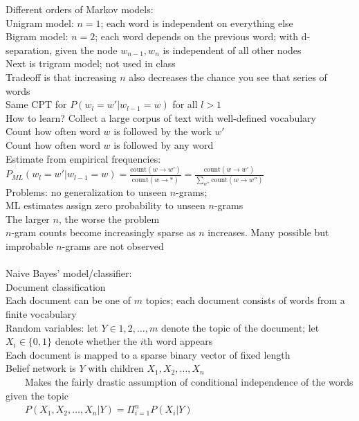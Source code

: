 \documentclass[10pt,letterpaper,unboxed,cm]{article}
\newcommand{\tab}{~~~~}
\begin{document}
Different orders of Markov models: \\
Unigram model: $n = 1$; each word is independent on everything else\\
Bigram model: $n = 2$; each word depends on the previous word; with d-separation, given the node $w_{n-1}, w_n$ is independent of all other nodes\\
Next is trigram model; not used in class\\
Tradeoff is that increasing $n$ also decreases the chance you see that series of words\\
Same CPT for $P(w_l = w'|w_{l-1} = w)$ for all $l > 1$\\
How to learn? Collect a large corpus of text with well-defined vocabulary\\
Count how often word $w$ is followed by the work $w'$\\
Count how often word $w$ is followed by any word\\
Estimate from empirical frequencies: \\
$P_{ML}(w_l = w'|w_{l-1} = w) = \frac{\text{count}(w \to w')}{\text{count}(w \to *)} = \frac{\text{count}(w \to w')}{\sum_{w''} \text{count}(w \to w'')}$\\
Problems: no generalization to unseen $n$-grams;\\
ML estimates assign zero probability to unseen $n$-grams\\
The larger $n$, the worse the problem\\
$n$-gram counts become increasingly sparse as $n$ increases. Many possible but improbable $n$-grams are not observed\\\\
Naive Bayes' model/classifier:\\
Document classification\\
Each document can be one of $m$ topics; each document consists of words from a finite vocabulary\\
Random variables: let $Y \in {1, 2, \ldots, m}$ denote the topic of the document; let $X_i \in \{0, 1\}$ denote whether the $i$th word appears\\
Each document is mapped to a sparse binary vector of fixed length\\
Belief network is $Y$ with children $X_1, X_2, \ldots, X_n$\\ 
\tab Makes the fairly drastic assumption of conditional independence of the words given the topic\\
\tab $P(X_1, X_2, \ldots, X_n|Y) = \Pi^n_{i=1} P(X_i|Y)$\\
\end{document}
